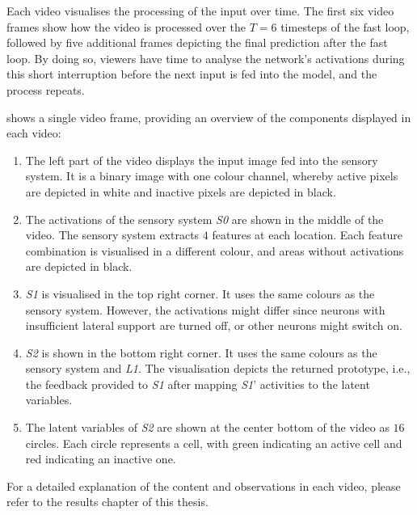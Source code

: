 Each video visualises the processing of the input over time.
The first six video frames show how the video is processed over the $T=6$ timesteps of the fast loop, followed by five additional frames depicting the final prediction after the fast loop.
By doing so, viewers have time to analyse the network's activations during this short interruption before the next input is fed into the model, and the process repeats.

 shows a single video frame, providing an overview of the components displayed in each video:
\begin{enumerate}
    \item The left part of the video displays the input image fed into the sensory system. It is a binary image with one colour channel, whereby active pixels are depicted in white and inactive pixels are depicted in black.
    \item The activations of the sensory system \emph{S0} are shown in the middle of the video. The sensory system extracts $4$ features at each location. Each feature combination is visualised in a different colour, and areas without activations are depicted in black.
    \item \emph{S1} is visualised in the top right corner. It uses the same colours as the sensory system. However, the activations might differ since neurons with insufficient lateral support are turned off, or other neurons might switch on.
    \item \emph{S2} is shown in the bottom right corner. It uses the same colours as the sensory system and \emph{L1}. The visualisation depicts the returned prototype, i.e., the feedback provided to \emph{S1} after mapping \emph{S1}' activities to the latent variables.
    \item The latent variables of \emph{S2} are shown at the center bottom of the video as $16$ circles. Each circle represents a cell, with green indicating an active cell and red indicating an inactive one. 
\end{enumerate}

For a detailed explanation of the content and observations in each video, please refer to the results chapter of this thesis.

